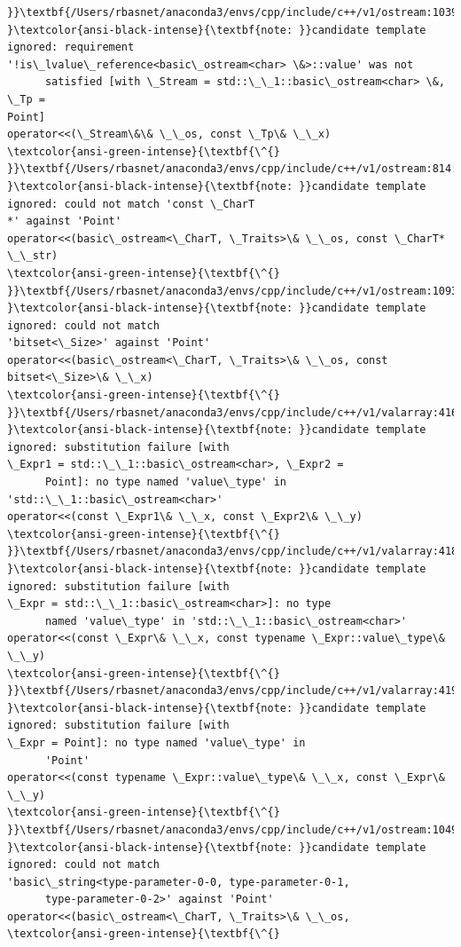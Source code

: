 \documentclass[11pt]{article}
\begin{document}
\begin{Verbatim}[commandchars=\\\{\}]
}}\textbf{/Users/rbasnet/anaconda3/envs/cpp/include/c++/v1/ostream:1039:1:
}\textcolor{ansi-black-intense}{\textbf{note: }}candidate template ignored: requirement
'!is\_lvalue\_reference<basic\_ostream<char> \&>::value' was not
      satisfied [with \_Stream = std::\_\_1::basic\_ostream<char> \&, \_Tp =
Point]
operator<<(\_Stream\&\& \_\_os, const \_Tp\& \_\_x)
\textcolor{ansi-green-intense}{\textbf{\^{}
}}\textbf{/Users/rbasnet/anaconda3/envs/cpp/include/c++/v1/ostream:814:1:
}\textcolor{ansi-black-intense}{\textbf{note: }}candidate template ignored: could not match 'const \_CharT
*' against 'Point'
operator<<(basic\_ostream<\_CharT, \_Traits>\& \_\_os, const \_CharT* \_\_str)
\textcolor{ansi-green-intense}{\textbf{\^{}
}}\textbf{/Users/rbasnet/anaconda3/envs/cpp/include/c++/v1/ostream:1093:1:
}\textcolor{ansi-black-intense}{\textbf{note: }}candidate template ignored: could not match
'bitset<\_Size>' against 'Point'
operator<<(basic\_ostream<\_CharT, \_Traits>\& \_\_os, const bitset<\_Size>\& \_\_x)
\textcolor{ansi-green-intense}{\textbf{\^{}
}}\textbf{/Users/rbasnet/anaconda3/envs/cpp/include/c++/v1/valarray:4165:1:
}\textcolor{ansi-black-intense}{\textbf{note: }}candidate template ignored: substitution failure [with
\_Expr1 = std::\_\_1::basic\_ostream<char>, \_Expr2 =
      Point]: no type named 'value\_type' in 'std::\_\_1::basic\_ostream<char>'
operator<<(const \_Expr1\& \_\_x, const \_Expr2\& \_\_y)
\textcolor{ansi-green-intense}{\textbf{\^{}
}}\textbf{/Users/rbasnet/anaconda3/envs/cpp/include/c++/v1/valarray:4180:1:
}\textcolor{ansi-black-intense}{\textbf{note: }}candidate template ignored: substitution failure [with
\_Expr = std::\_\_1::basic\_ostream<char>]: no type
      named 'value\_type' in 'std::\_\_1::basic\_ostream<char>'
operator<<(const \_Expr\& \_\_x, const typename \_Expr::value\_type\& \_\_y)
\textcolor{ansi-green-intense}{\textbf{\^{}
}}\textbf{/Users/rbasnet/anaconda3/envs/cpp/include/c++/v1/valarray:4196:1:
}\textcolor{ansi-black-intense}{\textbf{note: }}candidate template ignored: substitution failure [with
\_Expr = Point]: no type named 'value\_type' in
      'Point'
operator<<(const typename \_Expr::value\_type\& \_\_x, const \_Expr\& \_\_y)
\textcolor{ansi-green-intense}{\textbf{\^{}
}}\textbf{/Users/rbasnet/anaconda3/envs/cpp/include/c++/v1/ostream:1049:1:
}\textcolor{ansi-black-intense}{\textbf{note: }}candidate template ignored: could not match
'basic\_string<type-parameter-0-0, type-parameter-0-1,
      type-parameter-0-2>' against 'Point'
operator<<(basic\_ostream<\_CharT, \_Traits>\& \_\_os,
\textcolor{ansi-green-intense}{\textbf{\^{}

\end{Verbatim}
\end{document}
